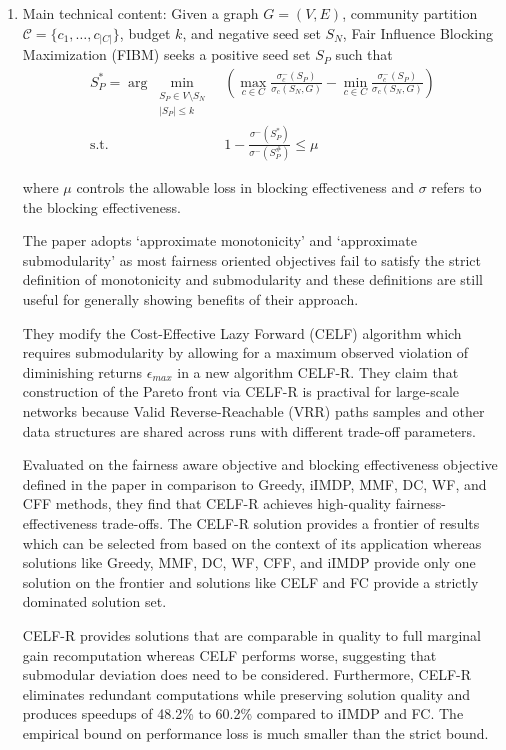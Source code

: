 \documentclass[11pt]{article}
\begin{document}
\begin{enumerate}
    \item Main technical content: Given a graph $G=(V,E)$, community partition $\mathcal{C}=\{c_1,\dots,c_{|C|}\}$, budget $k$, and negative seed set $S_N$, Fair Influence Blocking Maximization (FIBM) seeks a positive seed set $S_P$ such that
    \begin{equation}
    \begin{aligned}
        S^*_P=\arg\min_{\substack{S_P\in V\setminus S_N\\|S_P|\le k}}&\left(\max_{c\in C}\frac{\sigma^-_c(S_P)}{\sigma_c(S_N,G)}-\min_{c\in C}\frac{\sigma^-_c(S_P)}{\sigma_c(S_N,G)}\right)\\
        \text{s.t.}\quad & 1-\frac{\sigma^-(S^*_P)}{\sigma^-(S^\#_P)}\le\mu
    \end{aligned}
    \end{equation}

    where $\mu$ controls the allowable loss in blocking effectiveness and $\sigma$ refers to the blocking effectiveness.

    The paper adopts `approximate monotonicity' and `approximate submodularity' as most fairness oriented objectives fail to satisfy the strict definition of monotonicity and submodularity and these definitions are still useful for generally showing benefits of their approach.

    They modify the Cost-Effective Lazy Forward (CELF) algorithm which requires submodularity by allowing for a maximum observed violation of diminishing returns $\epsilon_{max}$ in a new algorithm CELF-R. They claim that construction of the Pareto front via CELF-R is practival for large-scale networks because Valid Reverse-Reachable (VRR) paths samples and other data structures are shared across runs with different trade-off parameters.

    Evaluated on the fairness aware objective and blocking effectiveness objective defined in the paper in comparison to Greedy, iIMDP, MMF, DC, WF, and CFF methods, they find that CELF-R achieves high-quality fairness-effectiveness trade-offs. The CELF-R solution provides a frontier of results which can be selected from based on the context of its application whereas solutions like Greedy, MMF, DC, WF, CFF, and iIMDP provide only one solution on the frontier and solutions like CELF and FC provide a strictly dominated solution set.

    CELF-R provides solutions that are comparable in quality to full marginal gain recomputation whereas CELF performs worse, suggesting that submodular deviation does need to be considered. Furthermore, CELF-R eliminates redundant computations while preserving solution quality and produces speedups of 48.2\% to 60.2\% compared to iIMDP and FC. The empirical bound on performance loss is much smaller than the strict bound.


\end{enumerate}
\end{document}
